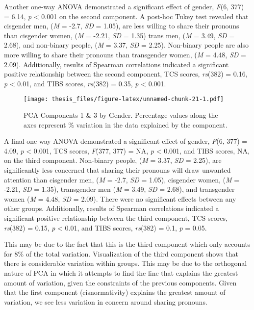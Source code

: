 \documentclass[12pt,twoside]{reedthesis}
\begin{document}
Another one-way ANOVA demonstrated a significant effect of gender, \emph{F}(6, 377) = 6.14, \emph{p} \textless{} 0.001 on the second component. A post-hoc Tukey test revealed that cisgender men, (\emph{M} = -2.7, \emph{SD} = 1.05), are less willing to share their pronouns than cisgender women, (\emph{M} = -2.21, \emph{SD} = 1.35) trans men, (\emph{M} = 3.49, \emph{SD} = 2.68), and non-binary people, (\emph{M} = 3.37, \emph{SD} = 2.25). Non-binary people are also more willing to share their pronouns than transgender women, (\emph{M} = 4.48, \emph{SD} = 2.09). Additionally, results of Spearman correlations indicated a significant positive relationship between the second component, TCS scores, \emph{rs}(382) = 0.16, \emph{p} \textless{} 0.01, and TIBS scores, \emph{rs}(382) = 0.35, \emph{p} \textless{} 0.001.
\begin{figure}
\centering
\texttt{[image: thesis\_files/figure-latex/unnamed-chunk-21-1.pdf]}
\caption{\label{fig:unnamed-chunk-21}PCA Components 1 \& 3 by Gender. Percentage values along the axes represent \% variation in the data explained by the component.}
\end{figure}
A final one-way ANOVA demonstrated a significant effect of gender, \emph{F}(6, 377) = 4.09, \emph{p} \textless{} 0.001, TCS scores, \emph{F}(377, 377) = NA, \emph{p} \textless{} 0.001, and TIBS scores, NA, on the third component. Non-binary people, (\emph{M} = 3.37, \emph{SD} = 2.25), are significantly less concerned that sharing their pronouns will draw unwanted attention than cisgender men, (\emph{M} = -2.7, \emph{SD} = 1.05), cisgender women, (\emph{M} = -2.21, \emph{SD} = 1.35), transgender men (\emph{M} = 3.49, \emph{SD} = 2.68), and transgender women (\emph{M} = 4.48, \emph{SD} = 2.09). There were no significant effects between any other groups. Additionally, results of Spearman correlations indicated a significant positive relationship between the third component, TCS scores, \emph{rs}(382) = 0.15, \emph{p} \textless{} 0.01, and TIBS scores, \emph{rs}(382) = 0.1, \emph{p} = 0.05.

This may be due to the fact that this is the third component which only accounts for 8\% of the total variation. Visualization of the third component shows that there is considerable variation within groups. This may be due to the orthogonal nature of PCA in which it attempts to find the line that explains the greatest amount of variation, given the constraints of the previous components. Given that the first component (cisnormativity) explains the greatest amount of variation, we see less variation in concern around sharing pronouns.
\end{document}
